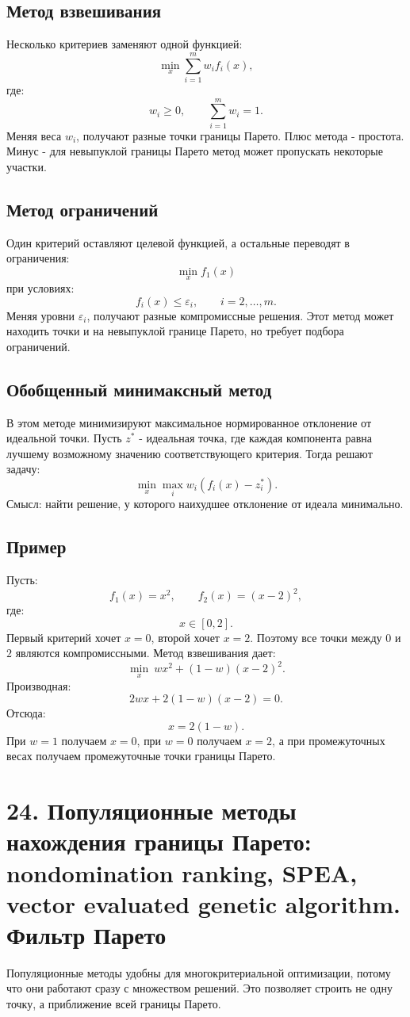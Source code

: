\documentclass[12pt,a4paper]{article}
\begin{document}
\subsection{Метод взвешивания}
Несколько критериев заменяют одной функцией:
\[
\min_x \sum_{i=1}^m w_i f_i(x),
\]
где:
\[
w_i\ge 0,\qquad \sum_{i=1}^m w_i=1.
\]
Меняя веса $w_i$, получают разные точки границы Парето.
Плюс метода - простота. Минус - для невыпуклой границы Парето метод может пропускать некоторые участки.
\subsection{Метод ограничений}
Один критерий оставляют целевой функцией, а остальные переводят в ограничения:
\[
\min_x f_1(x)
\]
при условиях:
\[
f_i(x)\le \varepsilon_i,\qquad i=2,\ldots,m.
\]
Меняя уровни $\varepsilon_i$, получают разные компромиссные решения.
Этот метод может находить точки и на невыпуклой границе Парето, но требует подбора ограничений.
\subsection{Обобщенный минимаксный метод}
В этом методе минимизируют максимальное нормированное отклонение от идеальной точки. Пусть $z^*$ - идеальная точка, где каждая компонента равна лучшему возможному значению соответствующего критерия. Тогда решают задачу:
\[
\min_x \max_i w_i\left(f_i(x)-z_i^*\right).
\]
Смысл: найти решение, у которого наихудшее отклонение от идеала минимально.
\subsection{Пример}
Пусть:
\[
f_1(x)=x^2,\qquad f_2(x)=(x-2)^2,
\]
где:
\[
x\in[0,2].
\]
Первый критерий хочет $x=0$, второй хочет $x=2$. Поэтому все точки между $0$ и $2$ являются компромиссными.
Метод взвешивания дает:
\[
\min_x\ w x^2+(1-w)(x-2)^2.
\]
Производная:
\[
2wx+2(1-w)(x-2)=0.
\]
Отсюда:
\[
x=2(1-w).
\]
При $w=1$ получаем $x=0$, при $w=0$ получаем $x=2$, а при промежуточных весах получаем промежуточные точки границы Парето.

\section{24. Популяционные методы нахождения границы Парето: nondomination ranking, SPEA, vector evaluated genetic algorithm. Фильтр Парето}
Популяционные методы удобны для многокритериальной оптимизации, потому что они работают сразу с множеством решений. Это позволяет строить не одну точку, а приближение всей границы Парето.
\end{document}
